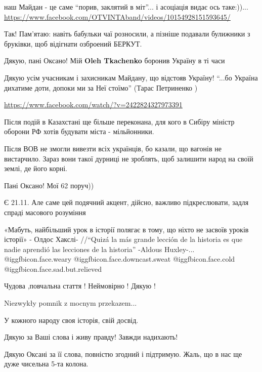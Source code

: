 \begin{itemize}

наш Майдан - це саме \enquote{порив, заклятий в міт}... і асоціація видає ось
таке:))... \url{https://www.facebook.com/OTVINTAband/videos/10154928151593645/}


Так! Пам'ятаю: навіть бабульки чаї розносили, а пізніше подавали булижники з
бруківки, щоб відігнати озброений БЕРКУТ.

Дякую, пані Оксано! Мій \textbf{Oleh Tkachenko} боронив Україну в ті часи


Дякую усім учасникам і захисникам Майдану, що відстояв Україну! \enquote{...бо Україна
дихатиме доти, допоки ми за Неї стоїмо} (Тарас Петриненко )

\url{https://www.facebook.com/watch/?v=2422824327973391}



Після подій в Казахстані ще більше переконана, для кого в Сибіру міністр
оборони РФ хотів будувати міста - мільйонники.

Після ВОВ не змогли вивезти всіх українців, бо казали, що вагонів не
вистарчило. Зараз вони такої дурниці не зроблять, щоб залишити народ на своїй
землі, де його корні.


Пані Оксано! Мої 62 поруч))

Є 21.11. Але саме цей подячний акцент, дійсно, важливо підкреслювати, задля спраді масового розуміння


«Мабуть, найбільший урок в історії полягає в тому, що ніхто не засвоїв уроків
історії» - Олдос Хакслі- //“Quizá la más grande lección de la historia es que
nadie aprendió las lecciones de la historia” -Aldous Huxley-... @igg{fbicon.face.weary}  @igg{fbicon.face.downcast.sweat}  @igg{fbicon.face.cold}  @igg{fbicon.face.sad.but.relieved} 

Чудова ,повчальна стаття !
Неймовірно !
Дякую !

Niezwykły pomnik z mocnym przekazem...

У кожного народу своя історія, свій досвід.

Дякую за Ваші слова і живу правду! Завжди надихають!

Дякую Оксані за її слова, повністю згодний і підтримую. Жаль, що в нас ще дуже чисельна 5-та колона.


\end{itemize}
